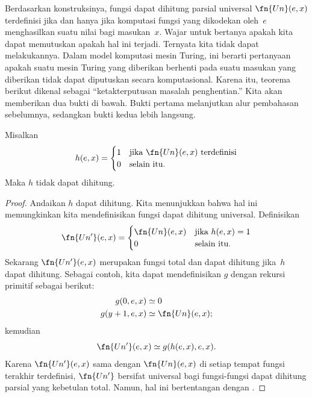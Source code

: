 \documentclass[../../../include/open-logic-section]{subfiles}
\begin{document}

Berdasarkan konstruksinya, fungsi dapat dihitung parsial universal
$\fn{Un}(e,x)$ terdefinisi jika dan hanya jika komputasi fungsi yang dikodekan
oleh~$e$ menghasilkan suatu nilai bagi masukan~$x$. Wajar untuk bertanya apakah
kita dapat memutuskan apakah hal ini terjadi. Ternyata kita tidak dapat
melakukannya. Dalam model komputasi mesin Turing, ini berarti pertanyaan apakah
suatu mesin Turing yang diberikan berhenti pada suatu masukan yang diberikan
tidak dapat diputuskan secara komputasional. Karena itu, teorema berikut dikenal
sebagai ``ketakterputusan masalah penghentian.'' Kita akan memberikan dua bukti
di bawah. Bukti pertama melanjutkan alur pembahasan sebelumnya, sedangkan bukti
kedua lebih langsung.

\begin{thm}
Misalkan
\[
h(e, x)  =
\begin{cases}
1 & \text{jika\/ $\fn{Un}(e, x)$ terdefinisi} \\
0 & \text{selain itu.}
\end{cases}
\]
Maka $h$ tidak dapat dihitung.
\end{thm}

\begin{proof}
Andaikan $h$ dapat dihitung. Kita menunjukkan bahwa hal ini memungkinkan kita
mendefinisikan fungsi dapat dihitung universal. Definisikan
\[
\fn{Un'}(e,x) =
\begin{cases}
\fn{Un}(e,x) & \text{jika $h(e,x) = 1$} \\
0 & \text{selain itu.}
\end{cases}
\]
Sekarang $\fn{Un'}(e, x)$ merupakan fungsi total dan dapat dihitung jika~$h$
dapat dihitung. Sebagai contoh, kita dapat mendefinisikan $g$ dengan rekursi
primitif sebagai berikut:
\begin{align*}
g(0, e, x) & \simeq 0 \\
g(y+1, e, x) & \simeq \fn{Un}(e,x);
\end{align*}
kemudian
\[
\fn{Un'}(e,x) \simeq g(h(e,x),e,x).
\]
Karena $\fn{Un'}(e,x)$ sama dengan $\fn{Un}(e,x)$ di setiap tempat fungsi
terakhir terdefinisi, $\fn{Un'}$ bersifat universal bagi fungsi-fungsi dapat
dihitung parsial yang kebetulan total. Namun, hal ini bertentangan dengan
.
\end{proof}
\end{document}
